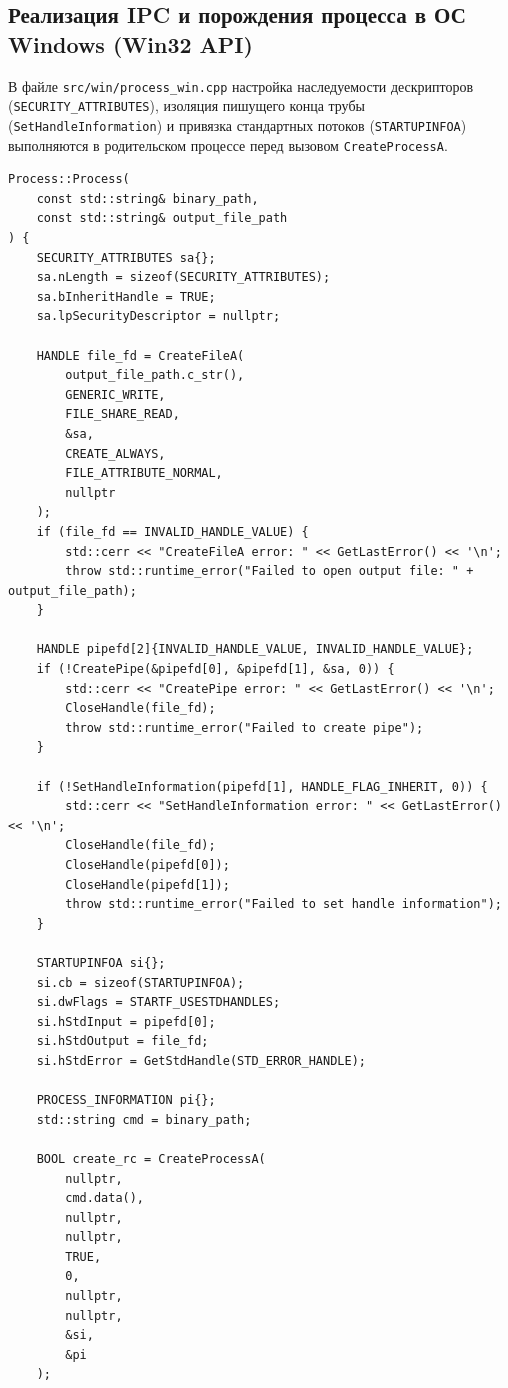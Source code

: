 \documentclass[11pt, a4paper]{article}
\begin{document}
\subsection{Реализация IPC и порождения процесса в ОС Windows (Win32 API)}
В файле \texttt{src/win/process\_win.cpp} настройка наследуемости дескрипторов (\texttt{SECURITY\_ATTRIBUTES}), изоляция пишущего конца трубы (\texttt{SetHandleInformation}) и привязка стандартных потоков (\texttt{STARTUPINFOA}) выполняются в родительском процессе перед вызовом \texttt{CreateProcessA}.

\begin{lstlisting}
Process::Process(
    const std::string& binary_path, 
    const std::string& output_file_path
) {
    SECURITY_ATTRIBUTES sa{};
    sa.nLength = sizeof(SECURITY_ATTRIBUTES);
    sa.bInheritHandle = TRUE;
    sa.lpSecurityDescriptor = nullptr;

    HANDLE file_fd = CreateFileA(
        output_file_path.c_str(),
        GENERIC_WRITE,
        FILE_SHARE_READ,
        &sa,
        CREATE_ALWAYS,
        FILE_ATTRIBUTE_NORMAL,
        nullptr
    );
    if (file_fd == INVALID_HANDLE_VALUE) {
        std::cerr << "CreateFileA error: " << GetLastError() << '\n';
        throw std::runtime_error("Failed to open output file: " + output_file_path);
    }

    HANDLE pipefd[2]{INVALID_HANDLE_VALUE, INVALID_HANDLE_VALUE};
    if (!CreatePipe(&pipefd[0], &pipefd[1], &sa, 0)) {
        std::cerr << "CreatePipe error: " << GetLastError() << '\n';
        CloseHandle(file_fd);
        throw std::runtime_error("Failed to create pipe");
    }

    if (!SetHandleInformation(pipefd[1], HANDLE_FLAG_INHERIT, 0)) {
        std::cerr << "SetHandleInformation error: " << GetLastError() << '\n';
        CloseHandle(file_fd);
        CloseHandle(pipefd[0]);
        CloseHandle(pipefd[1]);
        throw std::runtime_error("Failed to set handle information");
    }

    STARTUPINFOA si{};
    si.cb = sizeof(STARTUPINFOA);
    si.dwFlags = STARTF_USESTDHANDLES;
    si.hStdInput = pipefd[0];
    si.hStdOutput = file_fd;
    si.hStdError = GetStdHandle(STD_ERROR_HANDLE);

    PROCESS_INFORMATION pi{};
    std::string cmd = binary_path;

    BOOL create_rc = CreateProcessA(
        nullptr,
        cmd.data(),
        nullptr,
        nullptr,
        TRUE,
        0,
        nullptr,
        nullptr,
        &si,
        &pi
    );


\end{lstlisting}
\end{document}
